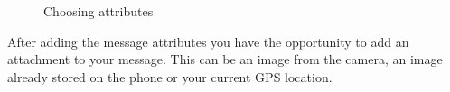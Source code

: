 \begin{figure}[h]
%
\caption{Choosing attributes}
\label{fig:OlimpicCircleTT1}
\end{figure}

\newpage
After adding the message attributes you have the opportunity to add an attachment to your message. This can be an image from the camera, an image already stored on the phone or your current GPS location. 

